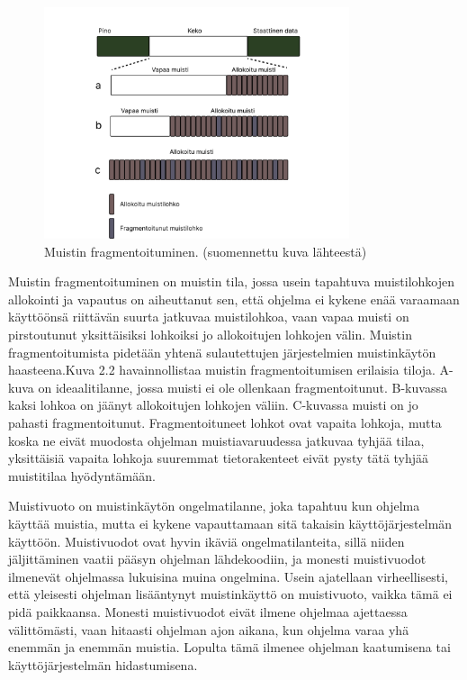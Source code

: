 \begin{figure}[tbh]
{\begin{centering}
\includegraphics[width=0.8\textwidth]{kuvat/fragmentaatio.pdf}
\par\end{centering}}
\caption{Muistin fragmentoituminen.\cite{ammsfmes@2016} (suomennettu kuva lähteestä)}
\end{figure}

Muistin fragmentoituminen on muistin tila, jossa usein tapahtuva muistilohkojen allokointi ja vapautus on aiheuttanut sen, että ohjelma ei kykene enää varaamaan käyttöönsä riittävän suurta jatkuvaa muistilohkoa, vaan vapaa muisti on pirstoutunut yksittäisiksi lohkoiksi jo allokoitujen lohkojen välin. Muistin fragmentoitumista pidetään yhtenä sulautettujen järjestelmien muistinkäytön haasteena.\cite{ammsfmes@2016}Kuva 2.2 havainnollistaa muistin fragmentoitumisen erilaisia tiloja. A-kuva on ideaalitilanne, jossa muisti ei ole ollenkaan fragmentoitunut. B-kuvassa kaksi lohkoa on jäänyt allokoitujen lohkojen väliin. C-kuvassa muisti on jo pahasti fragmentoitunut. Fragmentoituneet lohkot ovat vapaita lohkoja, mutta koska ne eivät muodosta ohjelman muistiavaruudessa jatkuvaa tyhjää tilaa, yksittäisiä vapaita lohkoja suuremmat tietorakenteet eivät pysty tätä tyhjää muistitilaa hyödyntämään.

Muistivuoto on muistinkäytön ongelmatilanne, joka tapahtuu kun ohjelma käyttää muistia, mutta ei kykene vapauttamaan sitä takaisin käyttöjärjestelmän käyttöön. Muistivuodot ovat hyvin ikäviä ongelmatilanteita, sillä niiden jäljittäminen vaatii pääsyn ohjelman lähdekoodiin, ja monesti muistivuodot ilmenevät ohjelmassa lukuisina muina ongelmina. Usein ajatellaan virheellisesti, että yleisesti ohjelman lisääntynyt muistinkäyttö on muistivuoto, vaikka tämä ei pidä paikkaansa. Monesti muistivuodot eivät ilmene ohjelmaa ajettaessa välittömästi, vaan hitaasti ohjelman ajon aikana, kun ohjelma varaa yhä enemmän ja enemmän muistia. Lopulta tämä ilmenee ohjelman kaatumisena tai käyttöjärjestelmän hidastumisena.\cite{mmic2010}

